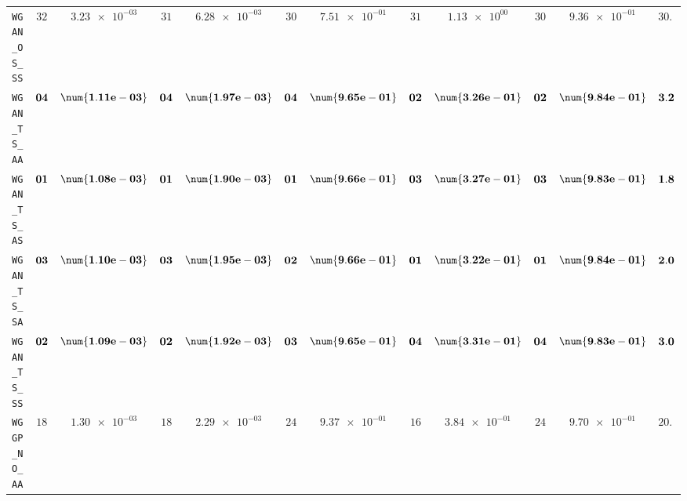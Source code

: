 \begin{xltabular}{\textwidth}{l||cC|cC|cC|cC|cC||c}
	\texttt{WGAN\_OS\_SS} & $ 32$ & $ \num{3.23e-03}$ & $ 31$ & $ \num{6.28e-03}$ & $ 30$ & $ \num{7.51e-01}$ & $ 31$ & $ \num{1.13e+00}$ & $ 30$ & $ \num{9.36e-01}$ & $ 30.8$  \\
	\texttt{WGAN\_TS\_AA} & $\bf 04$ & $\bf \num{1.11e-03}$ & $\bf 04$ & $\bf \num{1.97e-03}$ & $\bf 04$ & $\bf \num{9.65e-01}$ & $\bf 02$ & $\bf \num{3.26e-01}$ & $\bf 02$ & $\bf \num{9.84e-01}$ & $\bf 3.2$  \\
	\texttt{WGAN\_TS\_AS} & $\bf 01$ & $\bf \num{1.08e-03}$ & $\bf 01$ & $\bf \num{1.90e-03}$ & $\bf 01$ & $\bf \num{9.66e-01}$ & $\bf 03$ & $\bf \num{3.27e-01}$ & $\bf 03$ & $\bf \num{9.83e-01}$ & $\bf 1.8$  \\
	\texttt{WGAN\_TS\_SA} & $\bf 03$ & $\bf \num{1.10e-03}$ & $\bf 03$ & $\bf \num{1.95e-03}$ & $\bf 02$ & $\bf \num{9.66e-01}$ & $\bf 01$ & $\bf \num{3.22e-01}$ & $\bf 01$ & $\bf \num{9.84e-01}$ & $\bf 2.0$  \\
	\texttt{WGAN\_TS\_SS} & $\bf 02$ & $\bf \num{1.09e-03}$ & $\bf 02$ & $\bf \num{1.92e-03}$ & $\bf 03$ & $\bf \num{9.65e-01}$ & $\bf 04$ & $\bf \num{3.31e-01}$ & $\bf 04$ & $\bf \num{9.83e-01}$ & $\bf 3.0$  \\ \hline
	\texttt{WGGP\_NO\_AA} & $ 18$ & $ \num{1.30e-03}$ & $ 18$ & $ \num{2.29e-03}$ & $ 24$ & $ \num{9.37e-01}$ & $ 16$ & $ \num{3.84e-01}$ & $ 24$ & $ \num{9.70e-01}$ & $ 20.0$  \\

\end{xltabular}
